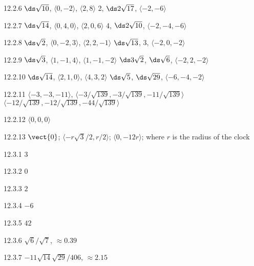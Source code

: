 \begin{Answer}{12.2.6}
$\ds \sqrt{10}$, $\langle 0,-2\rangle$, $\langle 2,8\rangle$
2, $\ds 2\sqrt{17}$, $\langle -2,-6\rangle$
\end{Answer}
\begin{Answer}{12.2.7}
$\ds \sqrt{14}$, $\langle 0,4,0\rangle$, $\langle 2,0,6\rangle$
4, $\ds 2\sqrt{10}$, $\langle -2,-4,-6\rangle$
\end{Answer}
\begin{Answer}{12.2.8}
$\ds \sqrt{2}$, $\langle 0,-2,3\rangle$, $\langle 2,2,-1\rangle$
$\ds \sqrt{13}$, $3$, $\langle -2, 0, -2\rangle$
\end{Answer}
\begin{Answer}{12.2.9}
$\ds \sqrt{3}$, $\langle 1,-1,4\rangle$, $\langle 1,-1,-2\rangle$
$\ds 3\sqrt{2}$, $\ds \sqrt{6}$, $\langle -2, 2, -2\rangle$
\end{Answer}
\begin{Answer}{12.2.10}
$\ds \sqrt{14}$, $\langle 2,1,0\rangle$, $\langle 4,3,2\rangle$
$\ds \sqrt{5}$, $\ds \sqrt{29}$, $\langle -6,-4, -2\rangle$
\end{Answer}
\begin{Answer}{12.2.11}
$\langle -3, -3, -11\rangle$,
$\langle -3/\sqrt{139},-3/\sqrt{139},-11/\sqrt{139}\rangle$
$\langle -12/\sqrt{139},-12/\sqrt{139},-44/\sqrt{139}\rangle$
\end{Answer}
\begin{Answer}{12.2.12}
$\langle 0,0,0\rangle$
\end{Answer}
\begin{Answer}{12.2.13}
$\vect{0}$; $\langle -r\sqrt3/2,r/2\rangle$; $\langle
0,-12r\rangle$; where $r$ is the radius of the clock
\end{Answer}
\begin{Answer}{12.3.1}
	$3$
\end{Answer}
\begin{Answer}{12.3.2}
	$0$
\end{Answer}
\begin{Answer}{12.3.3}
	$2$
\end{Answer}
\begin{Answer}{12.3.4}
	$-6$
\end{Answer}
\begin{Answer}{12.3.5}
	$42$
\end{Answer}
\begin{Answer}{12.3.6}
	$\sqrt6/\sqrt7$, $\approx 0.39$
\end{Answer}
\begin{Answer}{12.3.7}
	$-11\sqrt{14}\sqrt{29}/406$, $\approx 2.15$
\end{Answer}
